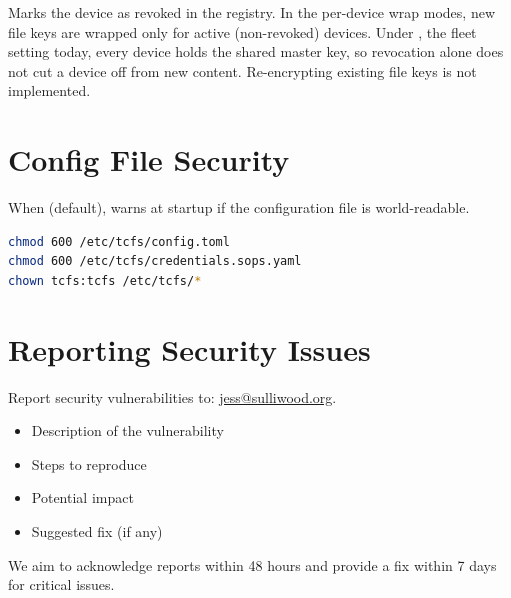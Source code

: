 \documentclass[11pt,a4paper]{article}
\begin{document}
Marks the device as revoked in the registry. In the per-device wrap modes,
new file keys are wrapped only for active (non-revoked) devices. Under
, the fleet setting today, every device holds the
shared master key, so revocation alone does not cut a device off from new
content.
Re-encrypting existing file keys is not implemented.

\section{Config File Security}

When  (default), \tcfsd{} warns at
startup if the configuration file is world-readable.

\begin{lstlisting}[language=bash]
chmod 600 /etc/tcfs/config.toml
chmod 600 /etc/tcfs/credentials.sops.yaml
chown tcfs:tcfs /etc/tcfs/*
\end{lstlisting}

\section{Reporting Security Issues}

Report security vulnerabilities to: \href{mailto:jess@sulliwood.org}{jess@sulliwood.org}.

\begin{itemize}
  \item Description of the vulnerability
  \item Steps to reproduce
  \item Potential impact
  \item Suggested fix (if any)
\end{itemize}

We aim to acknowledge reports within 48 hours and provide a fix within 7 days
for critical issues.
\end{document}
